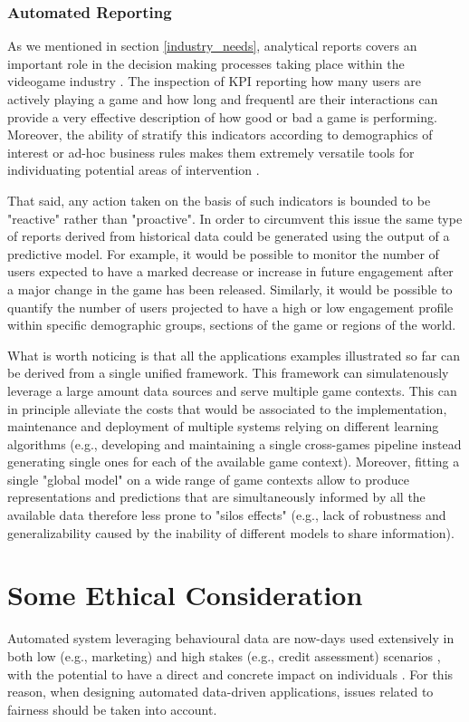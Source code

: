 \subsubsection{Automated Reporting}
As we mentioned in section \ref{industry_needs}, analytical reports covers an important role in the decision making processes taking place within the videogame industry \cite{el2016game}. The inspection of KPI reporting how many users are actively playing a game and how long and frequentl are their interactions can provide a very effective description of how good or bad a game is performing. Moreover, the ability of stratify this indicators according to demographics of interest or ad-hoc business rules makes them extremely versatile tools for individuating potential areas of intervention \cite{el2016game}.

That said, any action taken on the basis of such indicators is bounded to be "reactive" rather than "proactive". In order to circumvent this issue the same type of reports derived from historical data could be generated using the output of a predictive model. For example, it would be possible to monitor the number of users expected to have a marked decrease or increase in future engagement after a major change in the game has been released. Similarly, it would be possible to quantify the number of users projected to have a high or low engagement profile within specific demographic groups, sections of the game or regions of the world. 

What is worth noticing is that all the applications examples illustrated so far can be derived from a single unified framework. This framework  can simulatenously leverage a large amount data sources and serve multiple game contexts. This can in principle alleviate the costs that would be associated to the implementation, maintenance and deployment of multiple systems relying on different learning algorithms (e.g., developing and maintaining a single cross-games pipeline instead generating single ones for each of the available game context). Moreover, fitting a single "global model" on a wide range of game contexts allow to produce representations and predictions that are simultaneously informed by all the available data therefore less prone to "silos effects" (e.g., lack of robustness and generalizability caused by the inability of different models to share information). 

\section{Some Ethical Consideration}
\label{ehtical_considerations}
Automated system leveraging behavioural data are now-days used extensively in both low (e.g., marketing) and high stakes (e.g., credit assessment) scenarios \cite{mehrabi2021survey, dwivedi2021artificial}, with the potential to have a direct and concrete impact on individuals \cite{dwivedi2021artificial}. For this reason, when designing automated data-driven applications, issues related to fairness should be taken into account. 


